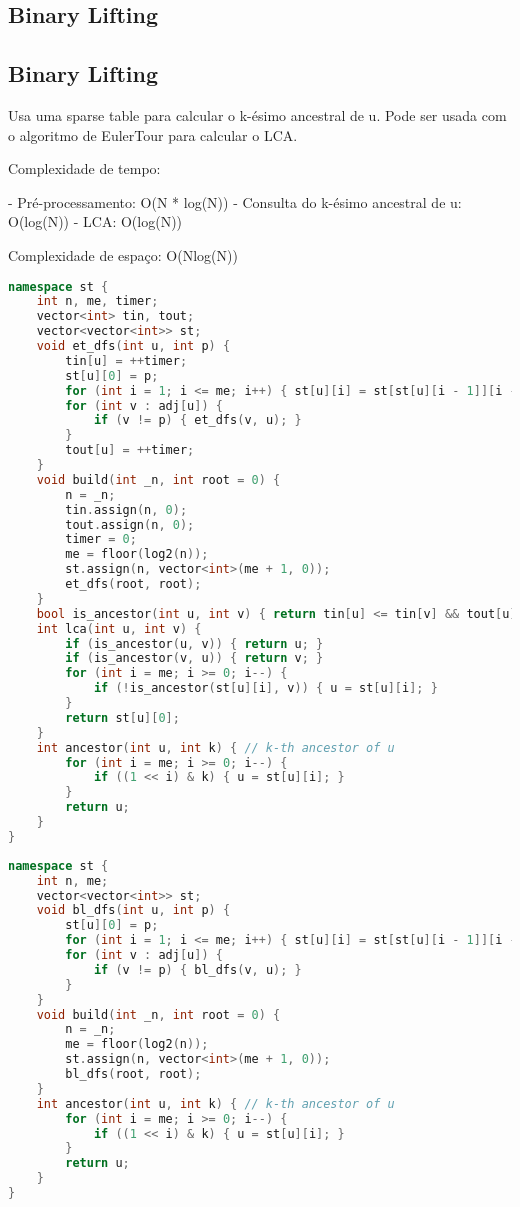 \documentclass[11pt, a4paper, twoside]{article}
\begin{document}
\subsection{Binary Lifting}

\subsection{Binary Lifting}


Usa uma sparse table para calcular o k-ésimo ancestral de u.
Pode ser usada com o algoritmo de EulerTour para calcular o LCA.

Complexidade de tempo:

- Pré-processamento: O(N * log(N))
- Consulta do k-ésimo ancestral de u: O(log(N))
- LCA: O(log(N))

Complexidade de espaço: O(Nlog(N))

\begin{lstlisting}[language=C++]
namespace st {
    int n, me, timer;
    vector<int> tin, tout;
    vector<vector<int>> st;
    void et_dfs(int u, int p) {
        tin[u] = ++timer;
        st[u][0] = p;
        for (int i = 1; i <= me; i++) { st[u][i] = st[st[u][i - 1]][i - 1]; }
        for (int v : adj[u]) {
            if (v != p) { et_dfs(v, u); }
        }
        tout[u] = ++timer;
    }
    void build(int _n, int root = 0) {
        n = _n;
        tin.assign(n, 0);
        tout.assign(n, 0);
        timer = 0;
        me = floor(log2(n));
        st.assign(n, vector<int>(me + 1, 0));
        et_dfs(root, root);
    }
    bool is_ancestor(int u, int v) { return tin[u] <= tin[v] && tout[u] >= tout[v]; }
    int lca(int u, int v) {
        if (is_ancestor(u, v)) { return u; }
        if (is_ancestor(v, u)) { return v; }
        for (int i = me; i >= 0; i--) {
            if (!is_ancestor(st[u][i], v)) { u = st[u][i]; }
        }
        return st[u][0];
    }
    int ancestor(int u, int k) { // k-th ancestor of u
        for (int i = me; i >= 0; i--) {
            if ((1 << i) & k) { u = st[u][i]; }
        }
        return u;
    }
}
\end{lstlisting}

\begin{lstlisting}[language=C++]
namespace st {
    int n, me;
    vector<vector<int>> st;
    void bl_dfs(int u, int p) {
        st[u][0] = p;
        for (int i = 1; i <= me; i++) { st[u][i] = st[st[u][i - 1]][i - 1]; }
        for (int v : adj[u]) {
            if (v != p) { bl_dfs(v, u); }
        }
    }
    void build(int _n, int root = 0) {
        n = _n;
        me = floor(log2(n));
        st.assign(n, vector<int>(me + 1, 0));
        bl_dfs(root, root);
    }
    int ancestor(int u, int k) { // k-th ancestor of u
        for (int i = me; i >= 0; i--) {
            if ((1 << i) & k) { u = st[u][i]; }
        }
        return u;
    }
}
\end{lstlisting}
\end{document}
